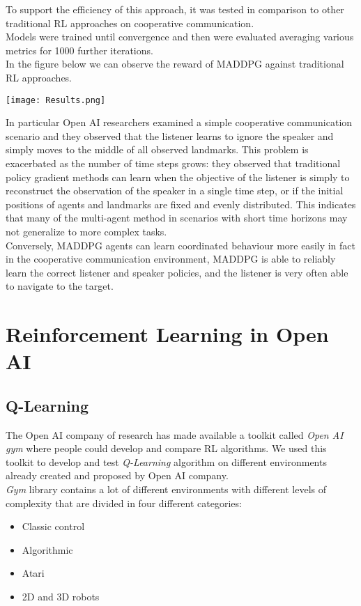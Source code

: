 \documentclass[]{report}
\begin{document}
To support the efficiency of this approach, it was tested in comparison to other traditional RL approaches on cooperative communication.\\ Models were trained until convergence and then were evaluated averaging various metrics for 1000 further iterations.\\
In the figure below we can observe the reward of MADDPG against traditional RL approaches.
\vspace{10 mm}

\begin{center}
	\texttt{[image: Results.png]}
\end{center}
\vspace{10 mm}
In particular Open AI researchers examined a simple cooperative communication scenario and they observed that the listener learns to ignore the speaker and simply moves to the middle of all observed landmarks.
This problem is exacerbated as the number of time steps grows: they observed that traditional policy
gradient methods can learn when the objective of the listener is simply to reconstruct the observation
of the speaker in a single time step, or if the initial positions of agents and landmarks are fixed and
evenly distributed. This indicates that many of the multi-agent method in scenarios with short time horizons may not generalize to more complex tasks.\\
Conversely, MADDPG agents can learn coordinated behaviour more easily in fact in the cooperative communication environment, MADDPG is able to reliably learn the correct listener and speaker policies, and the listener is  very often able to navigate to the target.






\chapter{Reinforcement Learning in Open AI}
\section{Q-Learning}
The Open AI company of research has made available a toolkit called \emph{Open AI gym} where people could 
develop and compare RL algorithms.
We used this toolkit to develop and test \emph{Q-Learning} algorithm on different environments already created and proposed by Open AI company. \\
\emph{Gym} library contains a lot of different environments with different levels of complexity that are divided in four different categories:
\begin{itemize}
	\item Classic control
	\item Algorithmic
	\item Atari
	\item 2D and 3D robots
\end{itemize}
\end{document}
